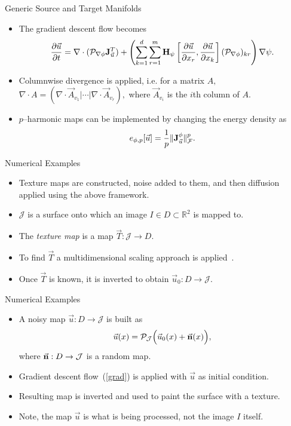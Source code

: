 \documentclass{beamer}
\begin{document}
\begin{frame}{Generic Source and Target Manifolds}
\begin{itemize}
\item The gradient descent flow becomes $$\frac{\partial \vec{u}}{\partial t} = \nabla \cdot (\mathcal{P}_{\nabla \phi} {\bf J}_{\vec{u}}^T) + \left( \sum_{k=1}^d \sum_{r=1}^m {\bf H}_{\psi} \left[ \frac{\partial \vec{u}}{\partial x_r},\frac{\partial \vec{u}}{\partial x_k}\right] (\mathcal{P}_{\nabla \phi})_{kr} \right) \nabla \psi.$$
\item Columnwise divergence is applied, i.e. for a matrix $A,$ $\nabla \cdot A = (\nabla \cdot \vec{A}_{v_1} | \cdots | \nabla \cdot \vec{A}_{v_r}),$ where $\vec{A}_{v_i}$ is the $i$th column of $A.$
\item $p$--harmonic maps can be implemented by changing the energy density as $$e_{\phi,p}[\vec{u}] = \frac{1}{p} \| {\bf J}_{\vec{u}}^{\phi} \|^p_{\mathcal{F}}.$$
\end{itemize}
\end{frame}

\begin{frame}{Numerical Examples}
\begin{itemize}
\item Texture maps are constructed, noise added to them,  and then diffusion applied using the above framework.
\item $\mathcal{J}$ is a surface onto which an image $I \in D \subset \mathbb{R}^2$ is mapped to. 
\item The {\it texture map} is a map $\vec{T} : \mathcal{J}\rightarrow D.$
\item To find $\vec{T}$ a multidimensional scaling approach is applied~\cite{fifty}.
\item Once $\vec{T}$ is known, it is inverted to obtain $\vec{u}_0 : D \rightarrow \mathcal{J}.$
\end{itemize}
\end{frame}

\begin{frame}{Numerical Examples}
\begin{itemize}
\item A noisy map $\vec{u}: D \rightarrow \mathcal{J}$ is built as $$\vec{u}(x) = \mathcal{P}_{\mathcal{J}} \Big( \vec{u}_0(x) + \vec{{\bf n}}(x) \Big) ,$$ where $\vec{{\bf n}}: D \rightarrow \mathcal{J}$ is a random map.
\item Gradient descent flow~(\ref{grad}) is applied with $\vec{u}$ as initial condition.
\item Resulting map is inverted and used to paint the surface with a texture.
\item Note, the map $\vec{u}$ is what is being processed, not the image $I$ itself.
\end{itemize}
\end{frame}
\end{document}
